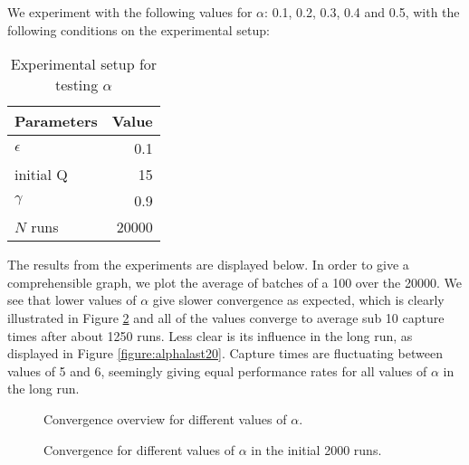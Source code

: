 \documentclass[paper=a4, fontsize=11pt]{scrartcl}
\makeatletter
\numberwithin{equation}{section}		%
\numberwithin{figure}{section}			%
\numberwithin{table}{section}				%
\newcounter{eqn}
\renewcommand*{\theeqn}{\alph{eqn})}
\newcommand{\num}{\refstepcounter{eqn}\text{\theeqn}\;}
\newcommand{\putindeepbox}[2][0.7\baselineskip]{{%
    \setbox0=\hbox{#2}%
    \setbox0=\vbox{\noindent\hsize=\wd0\unhbox0}
    \@tempdima=\dp0
    \advance\@tempdima by \ht0
    \advance\@tempdima by -#1\relax
    \dp0=\@tempdima
    \ht0=#1\relax
    \box0
}}
\makeatother
\begin{document}
We experiment with the following values for $\alpha$: 0.1, 0.2, 0.3, 0.4 and 0.5, with the following conditions on the experimental setup:
\begin{table}[H]
\caption{Experimental setup for testing $\alpha$}
\centering
\begin{tabular}{|l|r|}
\hline
Parameters & Value \\\hline
$\epsilon$ & 0.1 \\\hline
initial Q & 15 \\\hline
$\gamma$ & 0.9\\\hline
$N$ runs & 20000\\\hline
\end{tabular}
\label{expSetupAlpha}
\end{table}
The results from the experiments are displayed below. In order to give a comprehensible graph, we plot the average of batches of a 100 over the 20000. We see that lower values of $\alpha$ give slower convergence as expected, which is clearly  illustrated in Figure \ref{figure:alphafirst20} and all of the values converge to average sub 10 capture times after about 1250 runs. Less clear is its influence in the long run, as displayed in Figure \ref{figure:alphalast20}. Capture times are fluctuating between values of 5 and 6, seemingly giving equal performance rates for all values of $\alpha$ in the long run.
%
\begin{figure}[H] \centering
\caption{Convergence overview for different values of $\alpha$.} 
\label{figure:alphaOverview}
\end{figure}
\begin{figure}[H] \centering
\caption{Convergence for different values of $\alpha$ in the initial 2000 runs.} 
\label{figure:alphafirst20}
\end{figure}
\end{document}

